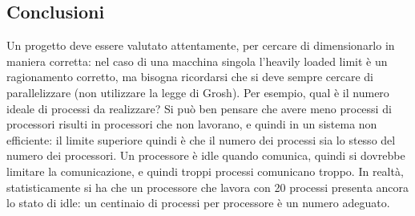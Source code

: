 \subsection{Conclusioni}
Un progetto deve essere valutato attentamente, per cercare di dimensionarlo in maniera corretta: nel caso di una
macchina singola l'heavily loaded limit è un ragionamento corretto, ma bisogna ricordarsi che si deve sempre cercare di
parallelizzare (non utilizzare la legge di Grosh). Per esempio, qual è il numero ideale di processi da realizzare? Si
può ben pensare che avere meno processi di processori risulti in processori che non lavorano, e quindi in un sistema 
non efficiente: il limite superiore quindi è che il numero dei processi sia lo stesso del numero dei processori. Un
processore è idle quando comunica, quindi si dovrebbe limitare la comunicazione, e quindi troppi processi comunicano
troppo.
In realtà, statisticamente si ha che un processore che lavora con 20 processi presenta ancora lo stato di idle: un
centinaio di processi per processore è un numero adeguato.
